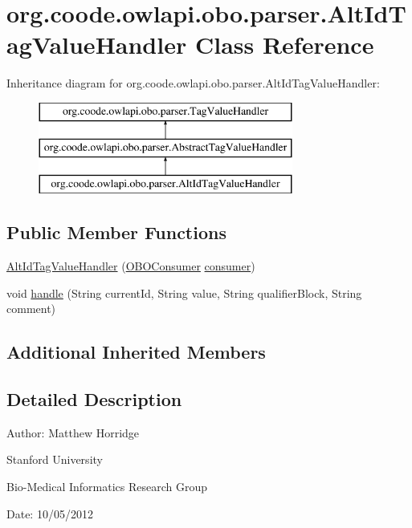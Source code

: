 \hypertarget{classorg_1_1coode_1_1owlapi_1_1obo_1_1parser_1_1_alt_id_tag_value_handler}{\section{org.\-coode.\-owlapi.\-obo.\-parser.\-Alt\-Id\-Tag\-Value\-Handler Class Reference}
\label{classorg_1_1coode_1_1owlapi_1_1obo_1_1parser_1_1_alt_id_tag_value_handler}
}
Inheritance diagram for org.\-coode.\-owlapi.\-obo.\-parser.\-Alt\-Id\-Tag\-Value\-Handler\-:\begin{figure}[H]
\begin{center}
\leavevmode
\includegraphics[height=3.000000cm]{classorg_1_1coode_1_1owlapi_1_1obo_1_1parser_1_1_alt_id_tag_value_handler}
\end{center}
\end{figure}
\subsection*{Public Member Functions}
\begin{DoxyCompactItemize}
\item 
\hyperlink{classorg_1_1coode_1_1owlapi_1_1obo_1_1parser_1_1_alt_id_tag_value_handler_a702723e1ddb9d02a5d8157a5af1769d4}{Alt\-Id\-Tag\-Value\-Handler} (\hyperlink{classorg_1_1coode_1_1owlapi_1_1obo_1_1parser_1_1_o_b_o_consumer}{O\-B\-O\-Consumer} \hyperlink{classorg_1_1coode_1_1owlapi_1_1obo_1_1parser_1_1_abstract_tag_value_handler_ab27f1ff22d15640c5f81585f18265137}{consumer})
\item 
void \hyperlink{classorg_1_1coode_1_1owlapi_1_1obo_1_1parser_1_1_alt_id_tag_value_handler_a7dcfae6b5a38e4b47dbdfecb536bb99f}{handle} (String current\-Id, String value, String qualifier\-Block, String comment)
\end{DoxyCompactItemize}
\subsection*{Additional Inherited Members}


\subsection{Detailed Description}
Author\-: Matthew Horridge\par
 Stanford University\par
 Bio-\/\-Medical Informatics Research Group\par
 Date\-: 10/05/2012 


